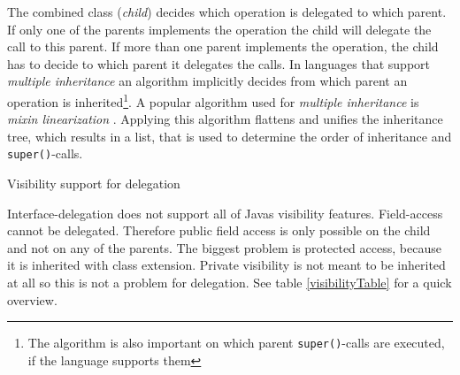 \documentclass{report}
\begin{document}
The combined class (\emph{child}) decides which operation is delegated to which parent. If only one of the parents implements the operation the child will delegate the call to this parent. If more than one parent implements the operation, the child has to decide to which parent it delegates the calls. In languages that support \emph{multiple inheritance} an algorithm implicitly decides from which parent an operation is inherited\footnote{The algorithm is also important on which parent \lstinline{super()}-calls are executed, if the language supports them}. A popular algorithm used for \emph{multiple inheritance} is \emph{mixin linearization} \cite{Bracha-Mixin-1990}. Applying this algorithm flattens and unifies the inheritance tree, which results in a list, that is used to determine the order of inheritance and \lstinline{super()}-calls.


\begin{table}
\def\arraystretch{1.2}
\setlength\fboxsep{0.6pt}
\centering
{}
\caption{Visibility support for delegation}
\label{visibilityTable}
\end{table}
Interface-delegation does not support all of Javas visibility features. Field-access cannot be delegated. Therefore public field access is only possible on the child and not on any of the parents. The biggest problem is protected access, because it is inherited with class extension. Private visibility is not meant to be inherited at all so this is not a problem for delegation. See table \ref{visibilityTable} for a quick overview.
\end{document}
